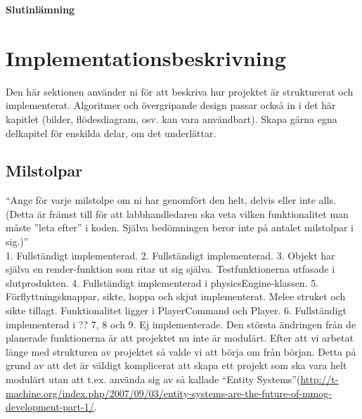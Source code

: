 \begin{center}
  \textbf{\Huge Slutinlämning}\\[1cm]
\end{center}
\section{Implementationsbeskrivning}
{\color{red}Den här sektionen använder ni för att beskriva hur projektet är strukturerat och implementerat. Algoritmer och övergripande design passar också in i det här kapitlet (bilder, flödesdiagram, osv. kan vara användbart). Skapa gärna egna delkapitel för enskilda delar, om det underlättar.\\ }
\subsection{Milstolpar}
{\color{red}``Ange för varje milstolpe om ni har genomfört den helt, delvis eller inte alls.  (Detta är främst till för att labbhandledaren ska veta vilken funktionalitet man måste ”leta efter” i koden.  Själva bedömningen beror inte på antalet milstolpar i sig.)''\\}
1. Fullständigt implementerad.
2. Fullständigt implementerad.
3. Objekt har själva en render-funktion som ritar ut sig själva. Testfunktionerna utfasade i slutprodukten.
4. Fullständigt implementerad i physicsEngine-klassen.
5. Förflyttningsknappar, sikte, hoppa och skjut implementerat. Melee struket och sikte tillagt. Funktionalitet ligger i PlayerCommand och Player.
6. Fullständigt implementerad i ??
7, 8 och 9. Ej implementerade.
Den största ändringen från de planerade funktionerna är att projektet nu inte är modulärt. Efter att vi arbetat länge med strukturen av projektet så valde vi att börja om från början. Detta på grund av att det är väldigt komplicerat att skapa ett projekt som ska vara helt modulärt utan att t.ex. använda sig av så kallade ``Entity Systems''(\url{http://t-machine.org/index.php/2007/09/03/entity-systems-are-the-future-of-mmog-development-part-1/}.\\
